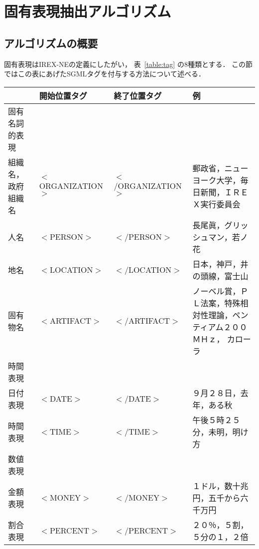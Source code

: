 \section{固有表現抽出アルゴリズム}
\label{sec:algorithm}

\subsection{アルゴリズムの概要}
\label{sec:overview}

固有表現はIREX-NEの定義にしたがい，
表~\ref{table:tag} の8種類とする．
この節ではこの表にあげたSGMLタグを付与する方法について述べる．

{\scriptsize
\begin{table*}[htbp]
  \begin{center}
    \caption{固有表現のタグ}
    \label{table:tag} 
      \begin{tabular}[c]{|l@{ }l@{ }l|p{4.7cm}|}
        \hline
        & 開始位置タグ & 終了位置タグ & 例\\
        \hline
        固有名詞的表現 & & & \\
        \hline
        \p 組織名，政府組織名 & $<$ORGANIZATION$>$ & $<$/ORGANIZATION$>$ 
        & 郵政省，ニューヨーク大学，毎日新聞，ＩＲＥＸ実行委員会\\
        \p 人名               & $<$PERSON$>$       & $<$/PERSON$>$ 
        & 長尾眞，グリッシュマン，若ノ花\\
        \p 地名               & $<$LOCATION$>$     & $<$/LOCATION$>$ 
        & 日本，神戸，井の頭線，富士山\\ 
        \p 固有物名           & $<$ARTIFACT$>$     & $<$/ARTIFACT$>$ 
        & ノーベル賞，ＰＬ法案，特殊相対性理論，ペンティアム２００ＭＨｚ，
        カローラ\\
        \hline
        時間表現 & & & \\
        \hline
        \p 日付表現           & $<$DATE$>$         & $<$/DATE$>$ 
        & ９月２８日，去年，ある秋\\
        \p 時間表現           & $<$TIME$>$         & $<$/TIME$>$ 
        & 午後５時２５分，未明，明け方\\
        \hline
        数値表現 & & & \\
        \hline
        \p 金額表現           & $<$MONEY$>$        & $<$/MONEY$>$ 
        & １ドル，数十兆円，五千から六千万円\\
        \p 割合表現           & $<$PERCENT$>$      & $<$/PERCENT$>$ 
        & ２０％，５割，５分の１，２倍\\
        \hline
      \end{tabular}
  \end{center}
\end{table*}
}

